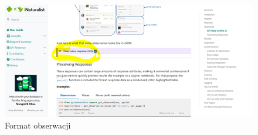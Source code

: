 \documentclass{article}
\begin{document}
 \begin{figure}[h] 
\begin{center}
\includegraphics[scale =1]{"json.png"}
\end{center}
\caption{Format obserwacji}
\label{}
\end{figure}
\end{document}
